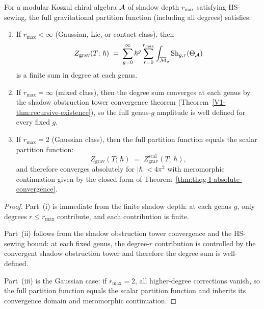 \begin{theorem}
\label{thm:thqg-I-full-convergence}
For a modular Koszul chiral algebra $\mathcal{A}$ of shadow depth $r_{\max}$ satisfying HS-sewing, the full gravitational partition function (including all degrees) satisfies:
\begin{enumerate}[label=\textup{(\roman*)}]
\item If $r_{\max} < \infty$ (Gaussian, Lie, or contact class), then
\begin{equation}%
Z_{\mathrm{grav}}(T;\,\hbar) \;=\; \sum_{g=0}^\infty \hbar^g \sum_{r=0}^{r_{\max}} \int_{\overline{\mathcal{M}}_g} \operatorname{Sh}_{g,r}(\Theta_\cA)
\end{equation}
is a finite sum in degree at each genus.
\item If $r_{\max} = \infty$ (mixed class), then the degree sum converges at each genus by the shadow obstruction tower convergence theorem \textup{(}Theorem~\ref{V1-thm:recursive-existence}\textup{)}, so the full genus-$g$ amplitude is well defined for every fixed $g$.
\item If $r_{\max} = 2$ (Gaussian class), then the full partition function equals the scalar partition function:
\begin{equation}%
Z_{\mathrm{grav}}(T;\,\hbar) \;=\; Z_{\mathrm{grav}}^{\mathrm{scal}}(T;\,\hbar),
\end{equation}
and therefore converges absolutely for $|\hbar| < 4\pi^2$ with meromorphic continuation given by the closed form of Theorem~\ref{thm:thqg-I-absolute-convergence}.
\end{enumerate}
\end{theorem}

\begin{proof}
Part~(i) is immediate from the finite shadow depth: at each genus $g$,
only degrees $r \leq r_{\max}$ contribute, and each contribution is
finite.

Part~(ii) follows from the shadow obstruction tower convergence and the HS-sewing
bound: at each fixed genus, the degree-$r$ contribution is controlled
by the convergent shadow obstruction tower and therefore the degree sum is
well-defined.

Part~(iii) is the Gaussian case: if $r_{\max}=2$, all higher-degree
corrections vanish, so the full partition function equals the scalar
partition function and inherits its convergence domain and meromorphic
continuation.
\end{proof}

